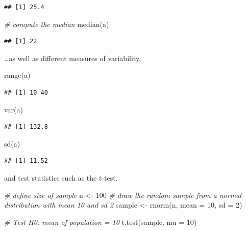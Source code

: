 \documentclass[
  12pt,
]{style/krantz}
\newenvironment{Shaded}{\begin{snugshade}}{\end{snugshade}}
\newcommand{\AttributeTok}[1]{\textcolor[rgb]{0.77,0.63,0.00}{#1}}
\newcommand{\CommentTok}[1]{\textcolor[rgb]{0.56,0.35,0.01}{\textit{#1}}}
\newcommand{\DecValTok}[1]{\textcolor[rgb]{0.00,0.00,0.81}{#1}}
\newcommand{\FunctionTok}[1]{\textcolor[rgb]{0.00,0.00,0.00}{#1}}
\newcommand{\NormalTok}[1]{#1}
\newcommand{\OtherTok}[1]{\textcolor[rgb]{0.56,0.35,0.01}{#1}}
\begin{document}
\begin{verbatim}
## [1] 25.4
\end{verbatim}

\begin{Shaded}
\begin{Highlighting}[]
\CommentTok{\# compute the median}
\FunctionTok{median}\NormalTok{(a)}
\end{Highlighting}
\end{Shaded}

\begin{verbatim}
## [1] 22
\end{verbatim}

\ldots as well as different measures of variability,

\begin{Shaded}
\begin{Highlighting}[]
\FunctionTok{range}\NormalTok{(a)}
\end{Highlighting}
\end{Shaded}

\begin{verbatim}
## [1] 10 40
\end{verbatim}

\begin{Shaded}
\begin{Highlighting}[]
\FunctionTok{var}\NormalTok{(a)}
\end{Highlighting}
\end{Shaded}

\begin{verbatim}
## [1] 132.8
\end{verbatim}

\begin{Shaded}
\begin{Highlighting}[]
\FunctionTok{sd}\NormalTok{(a)}
\end{Highlighting}
\end{Shaded}

\begin{verbatim}
## [1] 11.52
\end{verbatim}

and test statistics such as the t-test.

\begin{Shaded}
\begin{Highlighting}[]
\CommentTok{\# define size of sample}
\NormalTok{n }\OtherTok{\textless{}{-}} \DecValTok{100}
\CommentTok{\# draw the random sample from a normal distribution with mean 10 and sd 2}
\NormalTok{sample }\OtherTok{\textless{}{-}} \FunctionTok{rnorm}\NormalTok{(n, }\AttributeTok{mean =} \DecValTok{10}\NormalTok{, }\AttributeTok{sd =} \DecValTok{2}\NormalTok{)}

\CommentTok{\# Test H0: mean of population = 10 }
\FunctionTok{t.test}\NormalTok{(sample, }\AttributeTok{mu =} \DecValTok{10}\NormalTok{)}
\end{Highlighting}
\end{Shaded}
\end{document}
